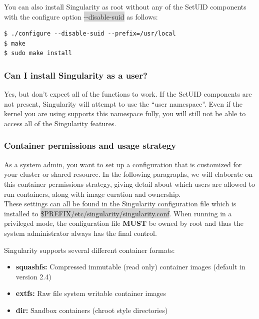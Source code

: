 \documentclass[a4paper]{article}
\newcounter{subsubsubsection}[subsubsection]
\begin{document}
You can also install Singularity as root without any of the SetUID components with the configure option \colorbox{lightgray}{-{}-disable-suid} as follows:

\begin{lstlisting}[frame=single]
$ ./configure --disable-suid --prefix=/usr/local
$ make
$ sudo make install
\end{lstlisting}

\subsubsection{Can I install Singularity as a user?}

Yes, but don’t expect all of the functions to work. If the SetUID components are not present, Singularity will attempt to use the “user namespace”. Even if the kernel you are using supports this namespace fully, you will still not be able to access all of the Singularity features.



\subsubsection{Container permissions and usage strategy}

As a system admin, you want to set up a configuration that is customized for your cluster or shared resource. In the following paragraphs, we will elaborate on this container permissions strategy, giving detail about which users are allowed to run containers, along with image curation and ownership.\\[0.1in]

These settings can all be found in the Singularity configuration file which is installed to \colorbox{lightgray}{\$PREFIX/etc/singularity/singularity.conf}. When running in a privileged mode, the configuration file \textbf{MUST} be owned by root and thus the system administrator always has the final control.




Singularity supports several different container formats:\\[0.1in]

\begin{itemize}
\item \textbf{squashfs:} Compressed immutable (read only) container images (default in version 2.4)
\item \textbf{extfs:} Raw file system writable container images
\item \textbf{dir:} Sandbox containers (chroot style directories)
\end{itemize}
\end{document}
